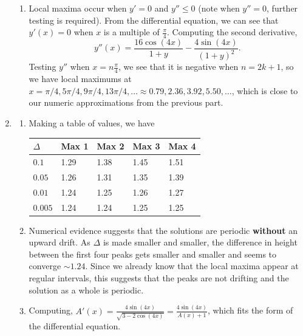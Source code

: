\begin{enumerate}
\begin{enumerate}
					\item Local maxima occur when $y'=0$ and $y''\leq 0$ (note when $y''=0$, further testing is required).
					From the differential equation, we can see that $y'(x)=0$ when $x$ is a multiple of $\frac{\pi}{4}$.
					Computing the second derivative,
					\[
						y''(x) = \frac{16\cos(4x)}{1+y} - \frac{4\sin(4x)}{(1+y)^2}.
					\]
					Testing $y''$ when $x=n\frac{\pi}{4}$, we see that it is negative when $n=2k+1$, so we have local maximums at
					$x=\pi/4, 5\pi/4, 9\pi/4, 13\pi/4,\ldots\approx0.79,2.36,3.92,5.50,\ldots$, which is close to our numeric approximations
					from the previous part.

			\end{enumerate}
			\item \begin{enumerate}
					\item Making a table of values, we have

					\begin{tabular}{l|l|l|l|l}
						$\Delta$&Max 1&Max 2&Max 3 &Max 4\\
						\hline
						$0.1$    & 1.29 & 1.38 & 1.45 & 1.51 \\
						$0.05$   & 1.26 & 1.31 & 1.35 & 1.39 \\
						$0.01$   & 1.24 & 1.25 & 1.26 & 1.27 \\
						$0.005$  & 1.24 & 1.24 & 1.25 & 1.25
					\end{tabular}

					\item Numerical evidence suggests that the solutions are periodic \textbf{without} an upward drift. As $\Delta$ is
					made smaller and smaller, the difference in height between the first four peaks gets smaller and smaller and
					seems to converge $\sim 1.24$. Since we already know that the local maxima appear at regular intervals, this suggests
					that the peaks are not drifting and the solution as a whole is periodic.

					\item Computing, $\displaystyle A'(x) = \frac{4\sin(4x)}{\sqrt{3-2\cos(4x)}} = \frac{4\sin(4x)}{A(x)+1}$, which fits the form
					of the differential equation.


\end{enumerate}
\end{enumerate}
